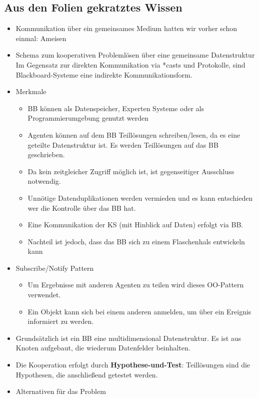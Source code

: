 \documentclass{article} %
\begin{document}
	\subsection{Aus den Folien gekratztes Wissen}
	\begin{itemize}
		\item Kommunikation über ein gemeinsames Medium hatten wir vorher schon einmal: Ameisen
		\item Schema zum kooperativen Problemlösen über eine gemeinsame Datenstruktur\\
		Im Gegensatz zur direkten Kommunikation via *casts und Protokolle, sind Blackboard-Systeme eine indirekte Kommunikationsform.
		\item Merkmale
			\begin{itemize}
			\item BB können als Datenspeicher, Experten Systeme oder als Programmierumgebung genutzt werden
			\item Agenten können auf dem BB Teillösungen schreiben/lesen, da es eine geteilte Datenstruktur ist. Es werden Teillösungen auf das BB geschrieben.
			\item Da kein zeitgleicher Zugriff möglich ist, ist gegenseitiger Ausschluss notwendig.
			\item Unnötige Datenduplikationen werden vermieden und es kann entschieden wer die Kontrolle über das BB hat.
			\item Eine Kommunikation der KS (mit Hinblick auf Daten) erfolgt via BB.
			\item Nachteil ist jedoch, dass das BB sich zu einem Flaschenhals entwickeln kann
			\end{itemize}
		\item Subscribe/Notify Pattern
			\begin{itemize}
			\item Um Ergebnisse mit anderen Agenten zu teilen wird dieses OO-Pattern verwendet.
			\item Ein Objekt kann sich bei einem anderen anmelden, um über ein Ereignis informiert zu werden.
			\end{itemize}
		\item Grundsätzlich ist ein BB eine multidimensional Datenstruktur. Es ist aus Knoten aufgebaut, die wiederum Datenfelder beinhalten.
		\item Die Kooperation erfolgt durch \textbf{Hypothese-und-Test}: Teillösungen sind die Hypothesen, die anschließend getestet werden.
		\item Alternativen für das Problem
			\begin{itemize}

\end{itemize}
\end{itemize}
\end{document}
